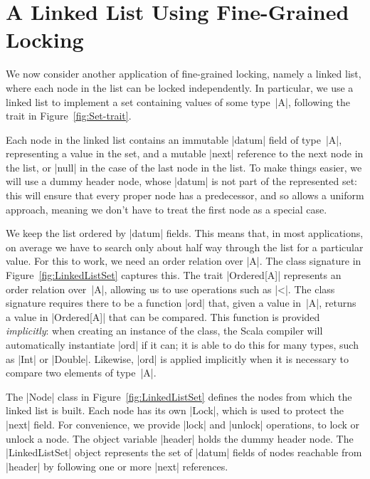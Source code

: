 \section{A Linked List Using Fine-Grained Locking}

We now consider another application of fine-grained locking, namely a linked
list, where each node in the list can be locked independently.  In particular,
we  use a linked list to implement a set containing values of some
type~|A|, following the trait in Figure~\ref{fig:Set-trait}.

Each node in the linked list  contains an immutable |datum| field of
type~|A|, representing a value in the set, and a mutable |next| reference to
the next node in the list, or |null| in the case of the last node in the list.
To make things easier, we will use a dummy header node, whose |datum| is not
part of the represented set: this will ensure that every proper node has a
predecessor, and so allows a uniform approach, meaning we don't have to treat
the first node as a special case.

We keep the list ordered by |datum| fields.  This means that, in most
applications, on average we have to search only about half way through the
list for a particular value.  For this to work, we need an order relation over
|A|.  The class signature in Figure~\ref{fig:LinkedListSet} captures this.
The trait |Ordered[A]| represents an order relation over~|A|, allowing us to
use operations such as |<|.  The class signature requires there to be a
function |ord| that, given a value in~|A|, returns a value in |Ordered[A]|
that can be compared.  This function is provided \emph{implicitly}: when
creating an instance of the class, the Scala compiler will automatically
instantiate |ord| if it can; it is able to do this for many types, such as
|Int| or |Double|.  Likewise, |ord| is applied implicitly when it is necessary
to compare two elements of type~|A|.

The |Node| class in Figure~\ref{fig:LinkedListSet} defines the nodes from
which the linked list is built.  Each node has its own |Lock|, which is used
to protect the |next| field.  For convenience, we provide |lock| and |unlock|
operations, to lock or unlock a node.  The object variable |header| holds the
dummy header node.
%
The |LinkedListSet| object represents the set of |datum| fields of nodes
reachable from |header| by following one or more |next| references.



